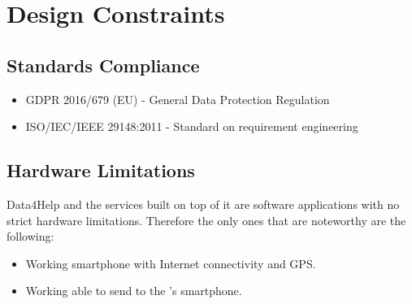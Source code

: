 \documentclass[../../rasd.tex]{subfiles}
\begin{document}
\section{Design Constraints}
			\subsection{Standards Compliance}
				\begin{itemize}
					\item GDPR 2016/679 (EU) - General Data Protection Regulation
					\item ISO/IEC/IEEE 29148:2011 - Standard on requirement engineering
				\end{itemize}
			\subsection{Hardware Limitations}
				Data4Help and the services built on top of it are software applications with no strict hardware limitations. Therefore the only ones that are noteworthy are the following:
				\begin{itemize}
					\item Working smartphone with Internet connectivity and GPS.
					\item Working  able to send  to the 's smartphone.
				\end{itemize}				
\end{document}
